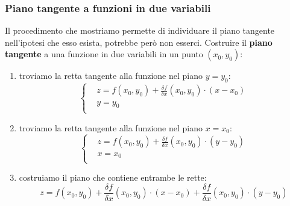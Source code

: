 \subsubsection{Piano tangente a funzioni in due variabili}
Il procedimento che mostriamo permette di individuare il piano tangente nell'ipotesi che esso esista, potrebbe però non esserci.\newline
\newline
Costruire il \textbf{piano tangente} a una funzione in due variabili in un punto $(x_0, y_0)$:
\begin{enumerate}
    \item troviamo la retta tangente alla funzione nel piano $y=y_0$:
    \[
        \begin{cases}
            &z = f(x_0, y_0) + \frac{\delta f}{\delta x}(x_0, y_0) \cdot (x-x_0)\\
            &y=y_0 \\
        \end{cases}
    \]
    \item troviamo la retta tangente alla funzione nel piano $x=x_0$:
    \[
        \begin{cases}
            &z = f(x_0, y_0) + \frac{\delta f}{\delta x}(x_0, y_0) \cdot (y-y_0)\\
            &x=x_0 \\
        \end{cases}
    \]
    \item costruiamo il piano che contiene entrambe le rette:
    \[
        z = f(x_0, y_0) + \frac{\delta f}{\delta x}(x_0, y_0) \cdot (x-x_0) + \frac{\delta f}{\delta x}(x_0, y_0) \cdot (y-y_0)
    \]
\end{enumerate}

